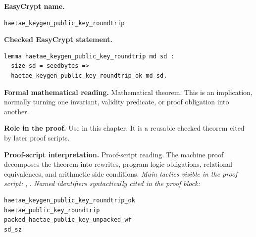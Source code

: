 \begin{formaltheorem}
\noindent\textbf{EasyCrypt name.}
\begin{lstlisting}[language=EasyCrypt,basicstyle=\ttfamily\scriptsize]
haetae_keygen_public_key_roundtrip
\end{lstlisting}
\noindent\textbf{Checked EasyCrypt statement.}
\begin{lstlisting}[language=EasyCrypt,basicstyle=\ttfamily\scriptsize]
lemma haetae_keygen_public_key_roundtrip md sd :
  size sd = seedbytes =>
  haetae_keygen_public_key_roundtrip_ok md sd.
\end{lstlisting}
\noindent\textbf{Formal mathematical reading.}
Mathematical theorem. This is an implication, normally turning one invariant, validity predicate, or proof obligation into another.

\noindent\textbf{Role in the proof.}
Use in this chapter. It is a reusable checked theorem cited by later proof scripts.

\noindent\textbf{Proof-script interpretation.}
Proof-script reading. The machine proof decomposes the theorem into rewrites, program-logic obligations, relational equivalences, and arithmetic side conditions.
\emph{Main tactics visible in the proof script:} , .
\emph{Named identifiers syntactically cited in the proof block:}
\begin{lstlisting}[language=EasyCrypt,basicstyle=\ttfamily\scriptsize]
haetae_keygen_public_key_roundtrip_ok
haetae_public_key_roundtrip
packed_haetae_public_key_unpacked_wf
sd_sz
\end{lstlisting}

\end{formaltheorem}


